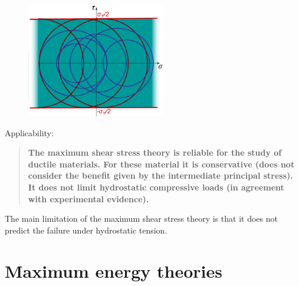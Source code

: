 \documentclass[class=report, crop=false, 12pt,a4paper]{standalone}
\begin{document}
\begin{figure}[H]
  \centering
  \includegraphics[height = 5cm]{../img/diagram90.png}
  \caption{}
\end{figure}
Applicability:
\begin{quotation}
  \textbf{The maximum shear stress theory is reliable for the study of ductile materials. For these material it is conservative (does not consider the benefit given by the intermediate principal stress). It does not limit hydrostatic compressive loads (in agreement with experimental evidence).}
\end{quotation}
The main limitation of the maximum shear stress theory is that it does not predict the failure under hydrostatic tension.
\section{Maximum energy theories}
\end{document}
